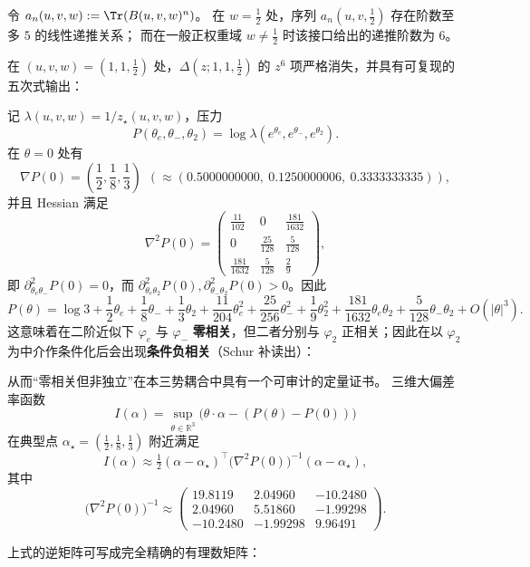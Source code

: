 \begin{corollary}\label{cor:sync-kernel-3d-recurrence-drop}
令 \(a_n(u,v,w):=\Tr(B(u,v,w)^n)\)。
在 \(w=\tfrac12\) 处，序列 \(a_n(u,v,\tfrac12)\) 存在阶数至多 \(5\) 的线性递推关系；
而在一般正权重域 \(w\neq\tfrac12\) 时该接口给出的递推阶数为 \(6\)。
\end{corollary}

\begin{proposition}[临界五次式指纹：\texorpdfstring{$(u,v,w)=(1,1,\tfrac12)$}{(u,v,w)=(1,1,1/2)}]\label{prop:sync-kernel-3d-critical-quintic}
在 \((u,v,w)=(1,1,\tfrac12)\) 处，\(\Delta(z;1,1,\tfrac12)\) 的 \(z^6\) 项严格消失，并具有可复现的五次式输出：

\end{proposition}
记 $\lambda(u,v,w)=1/z_\star(u,v,w)$，压力
\[
P(\theta_e,\theta_-,\theta_2)=\log\lambda(e^{\theta_e},e^{\theta_-},e^{\theta_2}).
\]
在 $\theta=0$ 处有
\[
\nabla P(0)=\left(\frac12,\frac18,\frac13\right)
\ \ (\approx (0.5000000000,\ 0.1250000006,\ 0.3333333335)),
\]
并且 Hessian 满足
\[
\nabla^2P(0)=
\begin{pmatrix}
\frac{11}{102} & 0 & \frac{181}{1632}\\
0 & \frac{25}{128} & \frac{5}{128}\\
\frac{181}{1632} & \frac{5}{128} & \frac{2}{9}
\end{pmatrix},
\]
即 $\partial^2_{\theta_e\theta_-}P(0)=0$，而 $\partial^2_{\theta_e\theta_2}P(0),\partial^2_{\theta_-\theta_2}P(0)>0$。因此
\[
P(\theta)=\log 3+\frac12\theta_e+\frac18\theta_-+\frac13\theta_2
+\frac{11}{204}\theta_e^2+\frac{25}{256}\theta_-^2+\frac19\theta_2^2
+\frac{181}{1632}\theta_e\theta_2+\frac{5}{128}\theta_-\theta_2+O(|\theta|^3).
\]
这意味着在二阶近似下 \(\varphi_e\) 与 \(\varphi_-\) \textbf{零相关}，但二者分别与 \(\varphi_2\) 正相关；因此在以 \(\varphi_2\) 为中介作条件化后会出现\textbf{条件负相关}（Schur 补读出）：



\noindent
从而“零相关但非独立”在本三势耦合中具有一个可审计的定量证书。
三维大偏差率函数
\[
I(\alpha)=\sup_{\theta\in\mathbb{R}^3}\bigl(\theta\cdot\alpha-(P(\theta)-P(0))\bigr)
\]
在典型点 $\alpha_\star=(\frac12,\frac18,\frac13)$ 附近满足
\[
I(\alpha)\approx \tfrac12(\alpha-\alpha_\star)^\top\bigl(\nabla^2P(0)\bigr)^{-1}(\alpha-\alpha_\star),
\]
其中
\[
\bigl(\nabla^2P(0)\bigr)^{-1}\approx
\begin{pmatrix}
19.8119 & 2.04960 & -10.2480\\
2.04960 & 5.51860 & -1.99298\\
-10.2480 & -1.99298 & 9.96491
\end{pmatrix}.
\]
\begin{proposition}\label{prop:sync-kernel-3d-hessian-inverse-exact}
上式的逆矩阵可写成完全精确的有理数矩阵：

\end{proposition}

